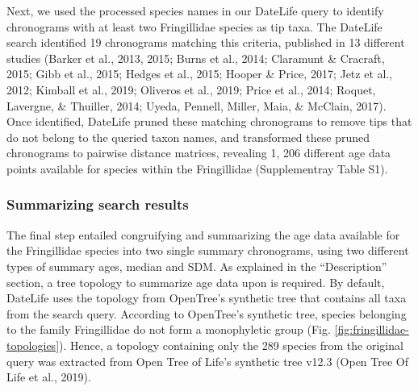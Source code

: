 \documentclass[english,man]{apa6}
\begin{document}
Next, we used the processed species names in our DateLife query to identify chronograms with at least two Fringillidae species as tip taxa.
The DateLife search identified 19 chronograms matching this criteria, published in 13 different studies (Barker et al., 2013, 2015; Burns et al., 2014; Claramunt \& Cracraft, 2015; Gibb et al., 2015; Hedges et al., 2015; Hooper \& Price, 2017; Jetz et al., 2012; Kimball et al., 2019; Oliveros et al., 2019; Price et al., 2014; Roquet, Lavergne, \& Thuiller, 2014; Uyeda, Pennell, Miller, Maia, \& McClain, 2017).
Once identified, DateLife pruned these matching chronograms to remove tips that do not belong to the queried taxon names, and transformed these pruned chronograms to pairwise distance matrices, revealing 1, 206 different age data points available for species within the Fringillidae (Supplementray Table S1).

\hypertarget{summarizing-search-results-2}{%
\subsubsection{Summarizing search results}\label{summarizing-search-results-2}}

The final step entailed congruifying and summarizing the age data available for the Fringillidae species into two single summary chronograms, using two different types of summary ages, median and SDM.
As explained in the \enquote{Description} section, a tree topology to summarize age data upon is required.
By default, DateLife uses the topology from OpenTree's synthetic tree that contains all taxa from the search query.
According to OpenTree's synthetic tree, species belonging to the family Fringillidae do not form a monophyletic group (Fig. \ref{fig:fringillidae-topologies}). Hence, a topology containing only the 289 species from the original query was extracted from Open Tree of Life's synthetic tree v12.3 (Open Tree Of Life et al., 2019).

\vspace{50mm}
\end{document}

